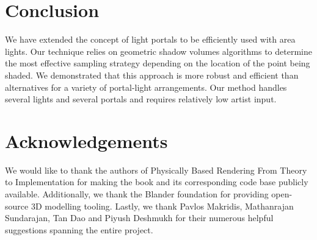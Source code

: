 \section{Conclusion}
\label{sec:conclusion}

We have extended the concept of light portals to be efficiently used with area lights. Our technique relies on geometric shadow volumes algorithms to determine the most effective sampling strategy depending on the location of the point being shaded. We demonstrated that this approach is more robust and efficient than alternatives for a variety of portal-light arrangements. Our method handles several lights and several portals and requires relatively low artist input. 

\section{Acknowledgements}

We would like to thank the authors of Physically Based Rendering From Theory to Implementation \cite*{pharrPhysicallyBasedRendering2016} for making the book and its corresponding code base publicly available. Additionally, we thank the Blander foundation for providing open-source 3D modelling tooling. Lastly, we thank Pavlos Makridis, Mathanrajan Sundarajan, Tan Dao and Piyush Deshmukh for their numerous helpful suggestions spanning the entire project.